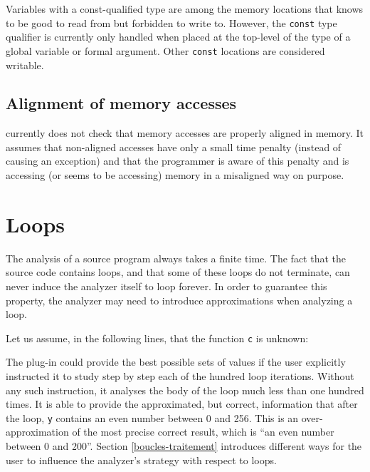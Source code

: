 \documentclass{frama-c-book}
\begin{document}
Variables with a const-qualified type are among the memory locations
that \Eva{} knows to be good to read from but forbidden to
write to. However, the \lstinline|const| type qualifier is currently only
handled when placed at the top-level of the type of a global variable
or formal argument. Other \lstinline|const| locations are considered
writable.

\subsection{Alignment of memory accesses}

\Eva{} currently does not check that memory accesses are
properly aligned in memory. It assumes that non-aligned accesses have
only a small time penalty (instead of causing an exception) and that the
programmer is aware of this penalty and is accessing (or seems to be accessing)
memory in a misaligned way on purpose. %


\section{Loops}
\label{boucles}

The analysis of a source program always takes a finite time.
The fact that the source code contains loops, and that some of these
loops do not terminate, can never induce the analyzer itself to loop forever.
In order to guarantee this property, the analyzer may need to
introduce approximations when analyzing a loop.
\medskip

Let us assume, in the following lines, that the function \lstinline|c|
is unknown:

The \Eva{} plug-in could provide the best possible sets of values
if the user explicitly instructed it to study step by step each
of the hundred loop iterations. Without any such instruction,
it analyses the body of the loop much less than
one hundred times. It is able to provide the approximated, but correct,
information that after the loop, \lstinline|y| contains an even number
between 0 and 256. This is an over-approximation of the most precise
correct result,
which is ``an even number between 0 and 200''.
Section \ref{boucles-traitement} introduces different ways for
the user to influence the analyzer's strategy with respect to
loops.
\end{document}
